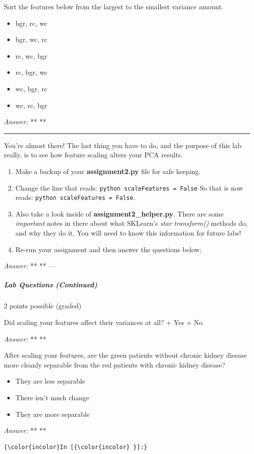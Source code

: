 \documentclass[11pt]{article}
\providecommand{\tightlist}{%
      \setlength{\itemsep}{0pt}\setlength{\parskip}{0pt}}
\begin{document}
Sort the features below from the largest to the smallest variance
amount.

\begin{itemize}
\tightlist
\item
  bgr, rc, wc
\item
  bgr, wc, rc
\item
  rc, wc, bgr
\item
  rc, bgr, wc
\item
  wc, bgr, rc
\item
  wc, rc, bgr
\end{itemize}

\emph{Answer:} ** **

\begin{center}\rule{0.5\linewidth}{\linethickness}\end{center}

You're almost there! The last thing you have to do, and the purpose of
this lab really, is to see how feature scaling alters your PCA results.

\begin{enumerate}
\def\labelenumi{\arabic{enumi}.}
\tightlist
\item
  Make a backup of your \textbf{assignment2.py} file for safe keeping.
\item
  Change the line that reads: \texttt{python\ scaleFeatures\ =\ False}
  So that is now reads: \texttt{python\ scaleFeatures\ =\ False}.
\item
  Also take a look inside of \textbf{assignment2\_helper.py}. There are
  some \emph{important} notes in there about what SKLearn's \emph{star
  transform()} methods do, and why they do it. You will need to know
  this information for future labs!
\item
  Re-run your assignment and then answer the questions below:
\end{enumerate}

\emph{Answer:} ** ** ---

\subparagraph{Lab Questions (Continued)}\label{lab-questions-continued}

2 points possible (graded)

Did scaling your features affect their variances at all? + Yes + No

\emph{Answer:} ** **

After scaling your features, are the green patients without chronic
kidney disease more cleanly separable from the red patients with chronic
kidney disease?

\begin{itemize}
\tightlist
\item
  They are less separable
\item
  There isn't much change
\item
  They are more separable
\end{itemize}

\emph{Answer:} ** **

    \begin{Verbatim}[commandchars=\\\{\}]
{\color{incolor}In [{\color{incolor} }]:} 
\end{Verbatim}


    
    
    
    
\end{document}
